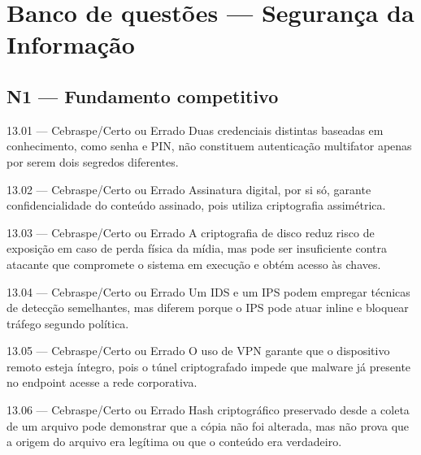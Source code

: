 \section{Banco de questões — Segurança da Informação}

\subsection*{N1 — Fundamento competitivo}

\begin{questao}{ 13.01 — Cebraspe/Certo ou Errado}
Duas credenciais distintas baseadas em conhecimento, como senha e PIN, não constituem autenticação multifator apenas por serem dois segredos diferentes.
\end{questao}

\begin{questao}{ 13.02 — Cebraspe/Certo ou Errado}
Assinatura digital, por si só, garante confidencialidade do conteúdo assinado, pois utiliza criptografia assimétrica.
\end{questao}

\begin{questao}{ 13.03 — Cebraspe/Certo ou Errado}
A criptografia de disco reduz risco de exposição em caso de perda física da mídia, mas pode ser insuficiente contra atacante que compromete o sistema em execução e obtém acesso às chaves.
\end{questao}

\begin{questao}{ 13.04 — Cebraspe/Certo ou Errado}
Um IDS e um IPS podem empregar técnicas de detecção semelhantes, mas diferem porque o IPS pode atuar inline e bloquear tráfego segundo política.
\end{questao}

\begin{questao}{ 13.05 — Cebraspe/Certo ou Errado}
O uso de VPN garante que o dispositivo remoto esteja íntegro, pois o túnel criptografado impede que malware já presente no endpoint acesse a rede corporativa.
\end{questao}

\begin{questao}{ 13.06 — Cebraspe/Certo ou Errado}
Hash criptográfico preservado desde a coleta de um arquivo pode demonstrar que a cópia não foi alterada, mas não prova que a origem do arquivo era legítima ou que o conteúdo era verdadeiro.
\end{questao}

